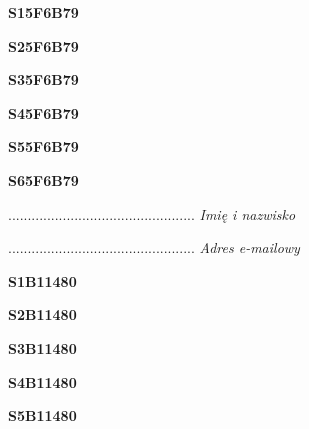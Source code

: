 \begin{turn}{90}\huge \textbf{S15F6B79}\end{turn}

\begin{turn}{90}\huge \textbf{S25F6B79}\end{turn}

\begin{turn}{90}\huge \textbf{S35F6B79}\end{turn}

\begin{turn}{90}\huge \textbf{S45F6B79}\end{turn}

\begin{turn}{90}\huge \textbf{S55F6B79}\end{turn}

\begin{turn}{90}\huge \textbf{S65F6B79}\end{turn}

\begin{turn}{90}\begin{minipage}{\linewidth} \vspace{20mm} ................................................  \textit{Imię i nazwisko}\end{minipage}\end{turn}

\begin{turn}{90}\begin{minipage}{\linewidth} \vspace{20mm} ................................................  \textit{Adres e-mailowy}\end{minipage}\end{turn}

\begin{turn}{90}\huge \textbf{S1B11480}\end{turn}

\begin{turn}{90}\huge \textbf{S2B11480}\end{turn}

\begin{turn}{90}\huge \textbf{S3B11480}\end{turn}

\begin{turn}{90}\huge \textbf{S4B11480}\end{turn}

\begin{turn}{90}\huge \textbf{S5B11480}\end{turn}


